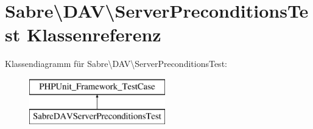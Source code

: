 \hypertarget{class_sabre_1_1_d_a_v_1_1_server_preconditions_test}{}\section{Sabre\textbackslash{}D\+AV\textbackslash{}Server\+Preconditions\+Test Klassenreferenz}
\label{class_sabre_1_1_d_a_v_1_1_server_preconditions_test}
Klassendiagramm für Sabre\textbackslash{}D\+AV\textbackslash{}Server\+Preconditions\+Test\+:\begin{figure}[H]
\begin{center}
\leavevmode
\includegraphics[height=2.000000cm]{class_sabre_1_1_d_a_v_1_1_server_preconditions_test}
\end{center}
\end{figure}
